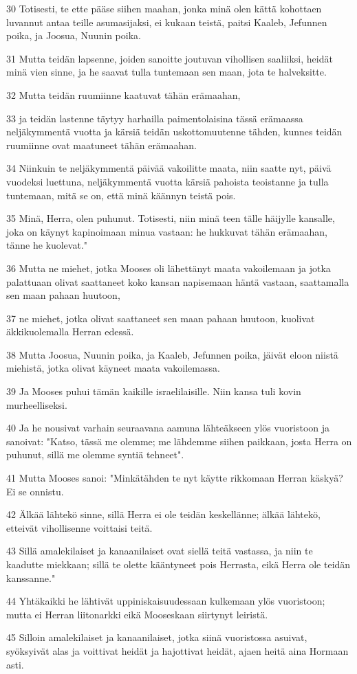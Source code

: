 \par 30 Totisesti, te ette pääse siihen maahan, jonka minä olen kättä kohottaen luvannut antaa teille asumasijaksi, ei kukaan teistä, paitsi Kaaleb, Jefunnen poika, ja Joosua, Nuunin poika.
\par 31 Mutta teidän lapsenne, joiden sanoitte joutuvan vihollisen saaliiksi, heidät minä vien sinne, ja he saavat tulla tuntemaan sen maan, jota te halveksitte.
\par 32 Mutta teidän ruumiinne kaatuvat tähän erämaahan,
\par 33 ja teidän lastenne täytyy harhailla paimentolaisina tässä erämaassa neljäkymmentä vuotta ja kärsiä teidän uskottomuutenne tähden, kunnes teidän ruumiinne ovat maatuneet tähän erämaahan.
\par 34 Niinkuin te neljäkymmentä päivää vakoilitte maata, niin saatte nyt, päivä vuodeksi luettuna, neljäkymmentä vuotta kärsiä pahoista teoistanne ja tulla tuntemaan, mitä se on, että minä käännyn teistä pois.
\par 35 Minä, Herra, olen puhunut. Totisesti, niin minä teen tälle häijylle kansalle, joka on käynyt kapinoimaan minua vastaan: he hukkuvat tähän erämaahan, tänne he kuolevat."
\par 36 Mutta ne miehet, jotka Mooses oli lähettänyt maata vakoilemaan ja jotka palattuaan olivat saattaneet koko kansan napisemaan häntä vastaan, saattamalla sen maan pahaan huutoon,
\par 37 ne miehet, jotka olivat saattaneet sen maan pahaan huutoon, kuolivat äkkikuolemalla Herran edessä.
\par 38 Mutta Joosua, Nuunin poika, ja Kaaleb, Jefunnen poika, jäivät eloon niistä miehistä, jotka olivat käyneet maata vakoilemassa.
\par 39 Ja Mooses puhui tämän kaikille israelilaisille. Niin kansa tuli kovin murheelliseksi.
\par 40 Ja he nousivat varhain seuraavana aamuna lähteäkseen ylös vuoristoon ja sanoivat: "Katso, tässä me olemme; me lähdemme siihen paikkaan, josta Herra on puhunut, sillä me olemme syntiä tehneet".
\par 41 Mutta Mooses sanoi: "Minkätähden te nyt käytte rikkomaan Herran käskyä? Ei se onnistu.
\par 42 Älkää lähtekö sinne, sillä Herra ei ole teidän keskellänne; älkää lähtekö, etteivät vihollisenne voittaisi teitä.
\par 43 Sillä amalekilaiset ja kanaanilaiset ovat siellä teitä vastassa, ja niin te kaadutte miekkaan; sillä te olette kääntyneet pois Herrasta, eikä Herra ole teidän kanssanne."
\par 44 Yhtäkaikki he lähtivät uppiniskaisuudessaan kulkemaan ylös vuoristoon; mutta ei Herran liitonarkki eikä Mooseskaan siirtynyt leiristä.
\par 45 Silloin amalekilaiset ja kanaanilaiset, jotka siinä vuoristossa asuivat, syöksyivät alas ja voittivat heidät ja hajottivat heidät, ajaen heitä aina Hormaan asti.


